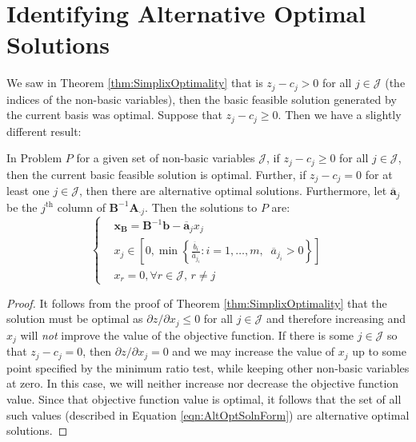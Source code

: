 \section{Identifying Alternative Optimal Solutions}
We saw in Theorem \ref{thm:SimplixOptimality} that is $z_j - c_j > 0$ for all $j \in \mathcal{J}$ (the indices of the non-basic variables), then the basic feasible solution generated by the current basis was optimal. Suppose that $z_j - c_j \geq 0$. Then we have a slightly different result:
\begin{theorem} In Problem $P$ for a given set of non-basic variables $\mathcal{J}$, if $z_j - c_j \geq 0$ for all $j \in \mathcal{J}$, then the current basic feasible solution is optimal. Further, if $z_j - c_j = 0$ for at least one $j \in \mathcal{J}$, then there are alternative optimal solutions. Furthermore, let $\overline{\mathbf{a}}_j$ be the $j^{\text{th}}$ column of $\mathbf{B}^{-1}\mathbf{A}_{\cdot j}$. Then the solutions to $P$ are:
\begin{equation} 
\left\{
\begin{aligned}
&\mathbf{x_B} = \mathbf{B}^{-1}\mathbf{b}  
-\overline{\mathbf{a}}_jx_j\\
&x_j \in \left[0,
\min\left\{
\frac{\overline{b}_i}{\overline{a}_{j_i}} : i=1,\dots,m,\;\;
\overline{a}_{j_i}>0
\right\}
\right]\\
&x_r = 0, \forall r\in\mathcal{J},\,r\neq j
\end{aligned}\right.
\label{eqn:AltOptSolnForm}
\end{equation}
\end{theorem}
\begin{proof} It follows from the proof of Theorem \ref{thm:SimplixOptimality} that the solution must be optimal as $\partial z/\partial x_j \leq 0$ for all $j \in \mathcal{J}$ and therefore increasing and $x_j$ will \textit{not} improve the value of the objective function. If there is some $j \in \mathcal{J}$ so that $z_j - c_j = 0$, then $\partial z/\partial x_j = 0$ and we may increase the value of $x_j$ up to some point specified by the minimum ratio test, while keeping other non-basic variables at zero. In this case, we will neither increase nor decrease the objective function value. Since that objective function value is optimal, it follows that the set of all such values (described in Equation \ref{eqn:AltOptSolnForm}) are alternative optimal solutions.
\end{proof}
